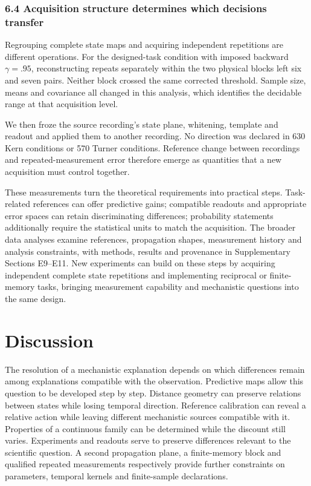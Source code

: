 \documentclass[11pt,a4paper]{article}
\begin{document}
\subsubsection{6.4 Acquisition structure determines which decisions
transfer}\label{acquisition-structure-determines-which-decisions-transfer}

Regrouping complete state maps and acquiring independent repetitions are
different operations. For the designed-task condition with imposed
backward \(\gamma=.95\), reconstructing repeats separately within the
two physical blocks left six and seven pairs. Neither block crossed the
same corrected threshold. Sample size, means and covariance all changed
in this analysis, which identifies the decidable range at that
acquisition level.

We then froze the source recording's state plane, whitening, template
and readout and applied them to another recording. No direction was
declared in 630 Kern conditions or 570 Turner conditions. Reference
change between recordings and repeated-measurement error therefore
emerge as quantities that a new acquisition must control together.

These measurements turn the theoretical requirements into practical
steps. Task-related references can offer predictive gains; compatible
readouts and appropriate error spaces can retain discriminating
differences; probability statements additionally require the statistical
units to match the acquisition. The broader data analyses examine
references, propagation shapes, measurement history and analysis
constraints, with methods, results and provenance in Supplementary
Sections E9–E11. New experiments can build on these steps by acquiring
independent complete state repetitions and implementing reciprocal or
finite-memory tasks, bringing measurement capability and mechanistic
questions into the same design.

\FloatBarrier

\section{Discussion}\label{discussion}

The resolution of a mechanistic explanation depends on which differences
remain among explanations compatible with the observation. Predictive
maps allow this question to be developed step by step. Distance geometry
can preserve relations between states while losing temporal direction.
Reference calibration can reveal a relative action while leaving
different mechanistic sources compatible with it. Properties of a
continuous family can be determined while the discount still varies.
Experiments and readouts serve to preserve differences relevant to the
scientific question. A second propagation plane, a finite-memory block
and qualified repeated measurements respectively provide further
constraints on parameters, temporal kernels and finite-sample
declarations.
\end{document}
